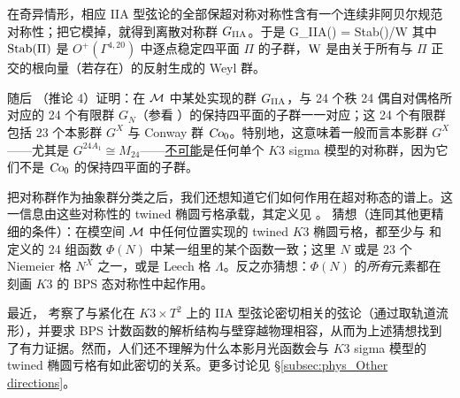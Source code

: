 在奇异情形，相应 IIA 型弦论的全部保超对称对称性含有一个连续非阿贝尔规范对称性；把它模掉，就得到离散对称群 $G_{\rm IIA}$。于是
\be
G_{\rm IIA}(\Pi) = {\rm Stab}(\Pi)/{\rm W} 
\ee
其中 ${\rm Stab}(\Pi)$ 是 $O^+(\Gamma^{4,20})$ 中逐点稳定四平面 $\Pi$ 的子群，${\rm W}$ 是由关于所有与 $\Pi$ 正交的根向量（若存在）的反射生成的 Weyl 群。


随后 \cite{ChengMirandaC.N.2016KSTL}（推论 4）证明：在 ${\cal M}$ 中某处实现的群 $G_{\rm IIA}$，与 24 个秩 24 偶自对偶格所对应的 24 个有限群 $G_N$（参看 ）的保持四平面的子群一一对应；这 24 个有限群包括 23 个本影群 $G^X$ 与 Conway 群 $\operatorname{\textsl{Co}}_0$。特别地，这意味着一般而言本影群 $G^X$——尤其是 $G^{24A_1}\cong M_{24}$——{\underline{不可能}}是任何单个 $K3$ sigma 模型的对称群，因为它们不是 $\operatorname{\textsl{Co}}_0$ 的保持四平面的子群。


把对称群作为抽象群分类之后，我们还想知道它们如何作用在超对称态的谱上。这一信息由这些对称性的 twined 椭圆亏格承载，其定义见 。\cite{ChengMirandaC.N.2016KSTL} 猜想（连同其他更精细的条件）：在模空间 ${\mathcal{M}}$ 中任何位置实现的 twined $K3$ 椭圆亏格，都至少与  和  定义的 24 组函数 $\Phi(N)$ 中某一组里的某个函数一致；这里 $N$ 或是 23 个 Niemeier 格 $N^X$ 之一，或是 Leech 格 $\Lambda$。反之亦猜想：$\Phi(N)$ 的{\it 所有}元素都在刻画 $K3$ 的 BPS 态对称性中起作用。


最近，\cite{Paquette:2017gmb} 考察了与紧化在 $K3 \times T^2$ 上的 IIA 型弦论密切相关的弦论（通过取轨道流形），并要求 BPS 计数函数的解析结构与壁穿越物理相容，从而为上述猜想找到了有力证据。然而，人们还不理解为什么本影月光函数会与 $K3$ sigma 模型的 twined 椭圆亏格有如此密切的关系。更多讨论见 \S\ref{subsec:phys_Other directions}。

